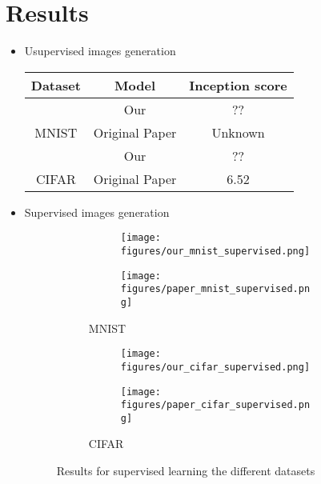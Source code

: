 \documentclass[a4paper, 11pt]{article}
\begin{document}
    \section*{Results}
    \begin{itemize}
        \item {Usupervised images generation

        \centering
        \begin{tabular}{|c|c|c|}
            \hline
            Dataset & Model & Inception score \\\hline


            & Our & ?? \\\cline{2-3}
            MNIST & Original Paper & Unknown\\\cline{2-3}
            \hline
            & Our &??\\\cline{2-3}
            CIFAR & Original Paper & 6.52 \\\cline{2-3}
            \hline
        \end{tabular}
        \centering
        }

        \item {Supervised images generation

        \begin{center}
            \begin{figure}[H]{\textwidth}
                \centring
                \begin{subfigure}[b]{\textwidth}
                    \centering
                    \begin{subfigure}[b]{0.15\textwidth}
                        \texttt{[image: figures/our\_mnist\_supervised.png]}
                    \end{subfigure}%
                    \begin{subfigure}[b]{0.15\textwidth}
                        \texttt{[image: figures/paper\_mnist\_supervised.png]}
                    \end{subfigure}%
                    \caption{MNIST}
                \end{subfigure}
                \begin{subfigure}[b]{\textwidth}
                    \centering
                    \begin{subfigure}[b]{0.15\textwidth}
                        \texttt{[image: figures/our\_cifar\_supervised.png]}
                    \end{subfigure}%
                    \begin{subfigure}[b]{0.15\textwidth}
                        \texttt{[image: figures/paper\_cifar\_supervised.png]}
                    \end{subfigure}%
                    \caption{CIFAR}
                \end{subfigure}
                \caption{Results for supervised learning the different datasets}
            \end{figure}
        \end{center}
        }
    \end{itemize}
\end{document}
